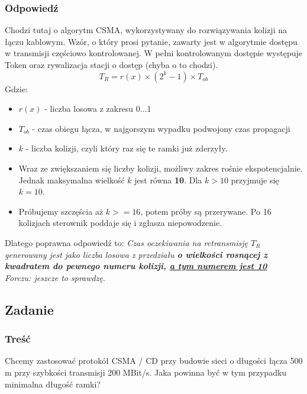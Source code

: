 \documentclass[a4paper,twoside]{article}
\begin{document}
\subsubsection{Odpowiedź}
Chodzi tutaj o algorytm CSMA, wykorzystywany do rozwiązywania kolizji na łączu kablowym. Wzór, o który prosi pytanie, zawarty jest w algorytmie dostępu w transmisji częściowo kontrolowanej. W pełni kontrolowanym dostępie występuje Token oraz rywalizacja stacji o dostęp (chyba o to chodzi).
$$ T_{R} = r(x)\times (2^{k}-1)\times T_{ob}$$Gdzie:
\begin{itemize}
	\item $ r(x) $ - liczba losowa z zakresu 0...1
	\item $ T_{ob} $ - czas obiegu łącza, w najgorszym wypadku podwojony czas propagacji
	\item $ k $ - liczba kolizji, czyli który raz się te ramki już zderzyły.
	\item Wraz ze zwiększaniem się liczby kolizji, możliwy zakres rośnie ekspotencjalnie. Jednak maksymalna wielkość $ k $ jest równa \textbf{10}. Dla $ k > 10 $ przyjmuje się $ k=10 $.
	\item Próbujemy szczęścia aż $ k >= 16 $, potem próby są przerywane. Po 16 kolizjach sterownik poddaje się i zgłasza niepowodzenie.
\end{itemize}
Dlatego poprawna odpowiedź to: \textit{Czas oczekiwania na retransmisję $ T_R $ generowany jest jako liczba losowa z przedziału \textbf{o wielkości rosnącej z kwadratem do pewnego numeru kolizji, \underline{a tym numerem jest 10}}}\\
{\small \emph{Forczu: jeszcze to sprawdzę}}.
\newpage
\subsection{Zadanie}
\subsubsection{Treść}
Chcemy zastosować protokół CSMA / CD przy budowie sieci o długości łącza 500 m przy szybkości transmisji 200 MBit/s. Jaka powinna być w tym przypadku minimalna długość ramki?
\end{document}

